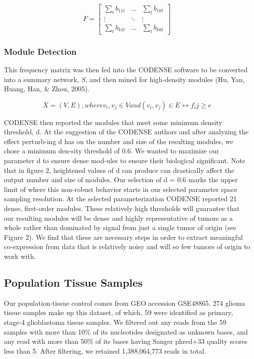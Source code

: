 \documentclass[11pt,twoside,a4paper]{article}
\begin{document}
\begin{equation}\label{equation5}
F = \left[ \begin{array}{ccc}
\sum_{t}b_{11t} & \ldots & \sum_{t}b_{1kt} \\
\vdots & \ddots & \vdots \\
\sum_{t}b_{k1t} & \ldots & \sum_{t}b_{kkt} \end{array} \right]
\end{equation}

\subsubsection{Module Detection}
This frequency matrix was then fed into the CODENSE software to be converted into a summary network, $S$, and then mined for high-density modules (Hu, Yan, Huang, Han, \& Zhou, 2005).  

\begin{equation}\label{equation6}
X=(V,E), where v_i,v_j \in V and (v_i,v_j) \in E \leftrightarrow f_ij \ge e
\end{equation}

CODENSE then reported the modules that meet some minimum density threshold, d. At the suggestion of the CODENSE authors and after analyzing the effect perturb-ing d has on the number and size of the resulting modules, we chose a minimum den-sity threshold of 0.6. We wanted to maximize our parameter d to ensure dense mod-ules to ensure their biological significant. Note that in figure 2, heightened values of d can produce can drastically affect the output number and size of modules. Our selection of d = 0.6 marks the upper limit of where this non-robust behavior starts in our selected parameter space sampling resolution. At the selected parameterization CODENSE reported 21 dense, first-order modules. These relatively high thresholds will guarantee that our resulting modules will be dense and highly representative of tumors as a whole rather than dominated by signal from just a single tumor of origin (see Figure 2).  We find that these are necessary steps in order to extract meaningful co-expression from data that is relatively noisy and will so few tumors of origin to work with.

\subsection{Population Tissue Samples}
Our population-tissue control comes from GEO accession GSE48865. 274 glioma tissue samples make up this dataset, of which, 59 were identified as primary, stage-4 glioblastoma tissue samples. We filtered out any reads from the 59 samples with more than 10\% of its nucleotides designated as unknown bases, and any read with more than 50\% of its bases having Sanger phred+33 quality scores less than 5. After filtering, we retained 1,388,064,773 reads in total. 
\end{document}
